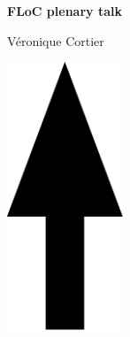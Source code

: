 \documentclass[a3paper]{article}
\begin{document}
\printGenericVSLHeaderBig
\begin{center}
\begin{vsltext}{3cm}{3.5cm}

    \vspace{1.5cm}

    \textbf{FLoC plenary talk} 

    Véronique Cortier

    \vspace{2cm}

    \includegraphics[height=8cm,keepaspectratio=true]{arrow_keynote.pdf}

\end{vsltext}

\end{center}
\end{document}
